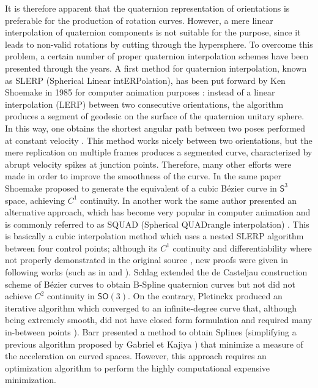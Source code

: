 It is therefore apparent that the quaternion representation of orientations is preferable for the production of rotation curves. However, a mere linear interpolation of quaternion components is not suitable for the purpose, since it leads to non-valid rotations by cutting through the hypersphere. To overcome this problem, a certain number of proper quaternion interpolation schemes have been presented through the years. A first method for quaternion interpolation, known as SLERP (Spherical Linear intERPolation), has been put forward by Ken Shoemake in 1985 for computer animation purposes \cite{shoemake1985animating}: instead of a linear interpolation (LERP) between two consecutive orientations, the algorithm produces a segment of geodesic on the surface of the quaternion unitary sphere. In this way, one obtains the shortest angular path between two poses performed at constant velocity \cite{dam1998quaternions}. This method works nicely between two orientations, but the mere replication on multiple frames produces a segmented curve, characterized by abrupt velocity spikes at junction points. Therefore, many other efforts were made in order to improve the smoothness of the curve. In the same paper \cite{shoemake1985animating} Shoemake proposed to generate the equivalent of a cubic B\'ezier curve in $\mathsf{S}^3$ space, achieving $C^1$ continuity. In another work the same author presented an alternative approach, which has become very popular in computer animation and is commonly referred to as SQUAD (Spherical QUADrangle interpolation) \cite{Shoemake1987QuaternionCA}. This is basically a cubic interpolation method which uses a nested SLERP algorithm between four control points; although its $C^{1}$ continuity and differentiability where not properly demonstrated in the original source \cite{dam1998quaternions}, new proofs were given in following works (such as in \cite{dam1998quaternions} and \cite{kim1996compact}). Schlag \cite{schlag1991using} extended the de Casteljau construction scheme of B\'ezier curves to obtain B-Spline quaternion curves but not did not achieve $C^{2}$ continuity in $\mathsf{SO}(3)$. On the contrary, Pletinckx \cite{pletinckx1989quaternion} produced an iterative algorithm which converged to an infinite-degree curve that, although being extremely smooth, did not have closed form formulation and required many in-between points \cite{kim1995ac}). Barr \cite{barr1992smooth} presented a method to obtain Splines (simplifying a previous algorithm proposed by Gabriel et Kajiya \cite{gabriel1985spline}) that minimize a measure of the acceleration on curved spaces. However, this approach requires an optimization algorithm to perform the highly computational expensive minimization. 

